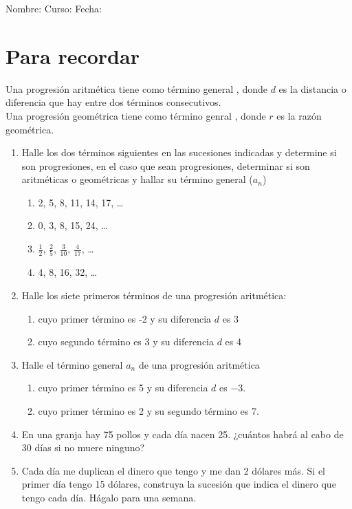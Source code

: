 \documentclass[letterpaper,fleqn]{article}
\newcommand{\LineaNombre}{%
\par
\vspace{\baselineskip}
Nombre:\hrulefill \; Curso: \underline{\hspace*{48pt}} \; Fecha: \underline{\hspace*{2.5cm}} \relax
\par}
\begin{document}
\LineaNombre
\section*{Para recordar}
Una progresi\'on aritmética tiene como término general , donde $d$ es la distancia o diferencia que hay entre dos términos consecutivos.\\

Una progresión geométrica tiene como término genral ,
donde $r$ es la razón geométrica.
\begin{enumerate}
\item Halle los dos términos siguientes en las sucesiones indicadas y determine si son progresiones, en el caso que sean progresiones, determinar si son aritméticas o geométricas y hallar su término general ($a_{n}$)
\begin{enumerate}
\item 2, 5, 8, 11, 14, 17, \ldots \noanswer
\item 0, 3, 8, 15, 24, \ldots \noanswer
\item $\frac{1}{2}$, $\frac{2}{5}$, $\frac{3}{10}$, $\frac{4}{17}$, \ldots \noanswer
\item 4, 8, 16, 32, \ldots \noanswer
\end{enumerate}
\item Halle los siete primeros términos de una progresión aritmética:
\begin{enumerate}
\item cuyo primer término es -2 y su diferencia $d$ es 3\vspace*{30pt}
\item cuyo segundo término es 3 y su diferencia $d$ es 4\vspace*{30pt}
\end{enumerate}
\item Halle el término general $a_{n}$ de una progresión aritmética
\begin{enumerate}
\item cuyo primer término es 5 y su diferencia $d$ es $-3$.\vspace*{40pt}
\item cuyo primer término es 2 y su segundo término es 7.\vspace*{40pt}
\end{enumerate}
\item En una granja hay 75 pollos y cada día nacen 25. ¿cuántos habrá al cabo de 30 días si no muere ninguno?\vspace*{50pt}
\item Cada día me duplican el dinero que tengo y me dan 2 dólares más. Si el primer día tengo 15 dólares, construya la sucesión que indica el dinero que tengo cada día. Hágalo para una semana.
\end{enumerate}
\end{document}
